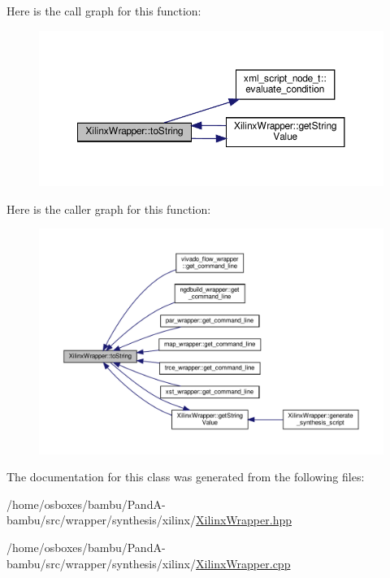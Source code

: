 Here is the call graph for this function\+:
\nopagebreak
\begin{figure}[H]
\begin{center}
\leavevmode
\includegraphics[width=350pt]{d4/da0/classXilinxWrapper_abda54a2f377b1570bf7c045713557edf_cgraph}
\end{center}
\end{figure}
Here is the caller graph for this function\+:
\nopagebreak
\begin{figure}[H]
\begin{center}
\leavevmode
\includegraphics[width=350pt]{d4/da0/classXilinxWrapper_abda54a2f377b1570bf7c045713557edf_icgraph}
\end{center}
\end{figure}


The documentation for this class was generated from the following files\+:\begin{DoxyCompactItemize}
\item 
/home/osboxes/bambu/\+Pand\+A-\/bambu/src/wrapper/synthesis/xilinx/\hyperlink{XilinxWrapper_8hpp}{Xilinx\+Wrapper.\+hpp}\item 
/home/osboxes/bambu/\+Pand\+A-\/bambu/src/wrapper/synthesis/xilinx/\hyperlink{XilinxWrapper_8cpp}{Xilinx\+Wrapper.\+cpp}\end{DoxyCompactItemize}
